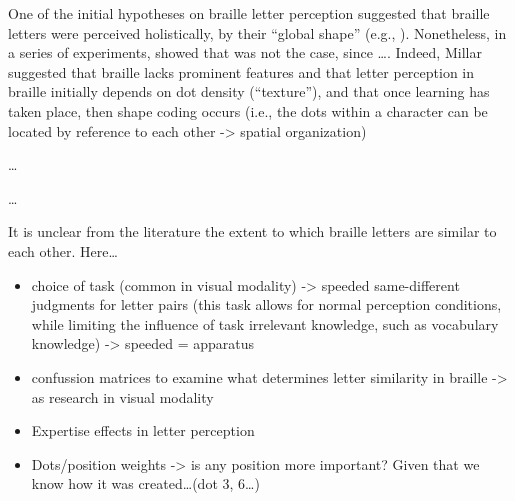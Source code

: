 \documentclass[english,man]{apa7}
\begin{document}
One of the initial hypotheses on braille letter perception suggested that braille letters were perceived holistically, by their \enquote{global shape} (e.g., {\colorbox{blue}{\sffamily\scriptsize\bfseries\color{white}{abl}}}{\sffamily\small\itshape\color{blue}{CITE: Nolan \& Kederis, 1969}}). Nonetheless, in a series of experiments, {\colorbox{blue}{\sffamily\scriptsize\bfseries\color{white}{abl}}}{\sffamily\small\itshape\color{blue}{CITE: Millar 1977 a, b, 1985, see also 2003...}} showed that was not the case, since \ldots{}{\colorbox{blue}{\sffamily\scriptsize\bfseries\color{white}{abl}}}{\sffamily\small\itshape\color{blue}{explain results: high accuracy in same/different but not able to recall/drawing...}}. Indeed, Millar suggested that braille lacks prominent features and that letter perception in braille initially depends on dot density (\enquote{texture}), and that once learning has taken place, then shape coding occurs (i.e., the dots within a character can be located by reference to each other -\textgreater{} spatial organization)

\ldots{} {\colorbox{blue}{\sffamily\scriptsize\bfseries\color{white}{abl}}}{\sffamily\small\itshape\color{blue}{link to what we're doing -- even though "braille letters are bound to be similar to each other"...are all of them equally similar?}}

\ldots{}{\colorbox{darkyellow}{\sffamily\scriptsize\bfseries\color{white}{pga}}}{\sffamily\small\itshape{}}

It is unclear from the literature the extent to which braille letters are similar to each other. Here\ldots{}

{\colorbox{darkyellow}{\sffamily\scriptsize\bfseries\color{white}{pga}}}{\sffamily\small\itshape\color{darkyellow}{Brief intro on what we are doing}}

\begin{itemize}
\item
  choice of task (common in visual modality) -\textgreater{} speeded same-different judgments for letter pairs (this task allows for normal perception conditions, while limiting the influence of task irrelevant knowledge, such as vocabulary knowledge) -\textgreater{} speeded = apparatus
\item
  confussion matrices to examine what determines letter similarity in braille -\textgreater{} as research in visual modality
\item
  Expertise effects in letter perception
\item
  Dots/position weights -\textgreater{} is any position more important? Given that we know how it was created\ldots{}(dot 3, 6\ldots{})
\end{itemize}
\end{document}
